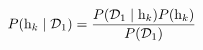 \begin{equation}
P( \mathrm{h}_{k} \mid \mathcal{D}_1 ) = \frac{P( \mathcal{D}_1 \mid \mathrm{h}_{k} ) P( \mathrm{h}_{k} )}{P( \mathcal{D}_1 )}
\label{eq:bayesian_update_step1}
\end{equation}


